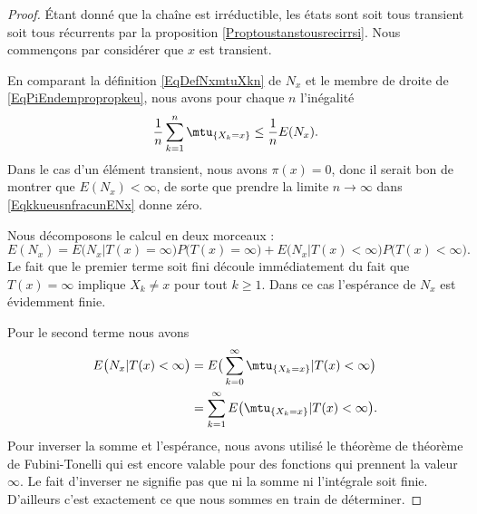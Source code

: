 \begin{proof}
    Étant donné que la chaîne est irréductible, les états sont soit tous transient soit tous récurrents par la proposition \ref{Proptoustanstousrecirrsi}. Nous commençons par considérer que \( x\) est transient.

    En comparant la définition \eqref{EqDefNxmtuXkn} de \( N_x\) et le membre de droite de \eqref{EqPiEndempropropkeu}, nous avons pour chaque \( n\) l'inégalité
    \begin{equation}    \label{EqkkueusnfracunENx}
        \frac{1}{ n }\sum_{k=1}^n\mtu_{\{ X_k=x \}}\leq\frac{1}{ n }E(N_x).
    \end{equation}
    Dans le cas d'un élément transient, nous avons \( \pi(x)=0\), donc il serait bon de montrer que \( E(N_x)<\infty\), de sorte que prendre la limite \( n\to\infty\) dans \eqref{EqkkueusnfracunENx} donne zéro.

    Nous décomposons le calcul en deux morceaux :
    \begin{equation}
        E(N_x)=E\big( N_x|T(x)=\infty \big)P\big( T(x)=\infty \big)+E\big( N_x|T(x)<\infty \big)P\big( T(x)<\infty \big).
    \end{equation}
    Le fait que le premier terme soit fini découle immédiatement du fait que \( T(x)=\infty\) implique \( X_k\neq x\) pour tout \( k\geq 1\). Dans ce cas l'espérance de \( N_x\) est évidemment finie.

    Pour le second terme nous avons
    \begin{subequations}
        \begin{align}
            E\big( N_x|T(x)<\infty \big)&=E\big( \sum_{k=0}^{\infty}\mtu_{\{ X_k=x \}}|T(x)<\infty \big)\\
            &=\sum_{k=1}^{\infty}E\big( \mtu_{\{ X_k=x \}}|T(x)<\infty \big).
        \end{align}
    \end{subequations}
    Pour inverser la somme et l'espérance, nous avons utilisé le théorème de théorème de Fubini-Tonelli qui est encore valable pour des fonctions qui prennent la valeur \( \infty\). Le fait d'inverser ne signifie pas que ni la somme ni l'intégrale soit finie. D'ailleurs c'est exactement ce que nous sommes en train de déterminer.


\end{proof}
